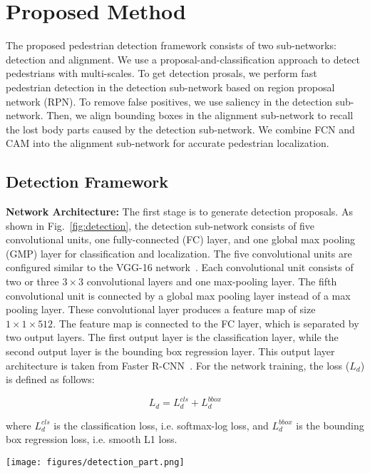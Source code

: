 \documentclass[journal]{IEEEtran}
\begin{document}
\section{Proposed Method}
\label{sec:ProposedMethod}
The proposed pedestrian detection framework consists of two sub-networks: detection and alignment. We use a proposal-and-classification approach to detect pedestrians with multi-scales. To get detection prosals, we perform fast pedestrian detection in the detection sub-network based on region proposal network (RPN). To remove false positives, we use saliency in the detection sub-network. Then, we align bounding boxes in the alignment sub-network to recall the lost body parts caused by the detection sub-network. We combine FCN and CAM into the alignment sub-network for accurate pedestrian localization.


\subsection{Detection Framework}
\label{subsec:DetectionFramework}

 \textbf{Network Architecture:} The first stage is to generate detection proposals. As shown in Fig.~\ref{fig:detection}, the detection sub-network consists of five convolutional units, one fully-connected (FC) layer, and one global max pooling (GMP) layer for classification and localization. The five convolutional units are configured similar to the VGG-16 network~\cite{simonyan2014very}. Each convolutional unit consists of two or three $3 \times 3$ convolutional layers and one max-pooling layer. The fifth convolutional unit is connected by a global max pooling layer instead of a max pooling layer. These convolutional layer produces a feature map of size $1 \times 1 \times 512$. The feature map is connected to the FC layer, which is separated by two output layers. The first output layer is the classification layer, while the second output layer is the bounding box regression layer. This output layer architecture is taken from Faster R-CNN~\cite{ren2015faster}. For the network training, the loss ($L_{d}$) is defined as follows:

\begin{equation}
	L_{d} = L_{d}^{cls} + L_{d}^{bbox}
\end{equation}

where $L_{d}^{cls}$ is the classification loss, i.e. softmax-log loss, and $L_{d}^{bbox}$ is the bounding box regression loss, i.e. smooth L1 loss.


\begin{figure*}[t]
\centering
\centerline{\texttt{[image: figures/detection\_part.png]}}
\caption{Architecture of the proposed detection sub-network. }
\label{fig:detection}
\end{figure*}
\end{document}
